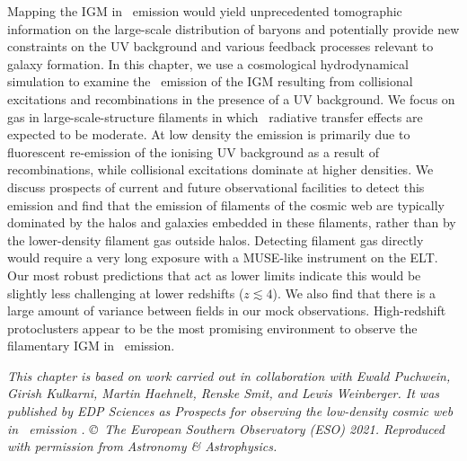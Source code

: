    \fancyhf{}
    \fancyfoot[C]{\color{white}\thepage}
    \newpage
    \setFancyHdr
\fi


\vspace*{\fill}

\noindent Mapping the IGM in \lya\ emission would yield unprecedented tomographic information on the large-scale distribution of baryons and potentially provide new constraints on the UV background and various feedback processes relevant to galaxy formation. In this chapter, we use a cosmological hydrodynamical simulation to examine the \lya\ emission of the IGM resulting from collisional excitations and recombinations in the presence of a UV background. We focus on gas in large-scale-structure filaments in which \lya\ radiative transfer effects are expected to be moderate. At low density the emission is primarily due to fluorescent re-emission of the ionising UV background as a result of recombinations, while collisional excitations dominate at higher densities. We discuss prospects of current and future observational facilities to detect this emission and find that the emission of filaments of the cosmic web are typically dominated by the halos and galaxies embedded in these filaments, rather than by the lower-density filament gas outside halos. Detecting filament gas directly would require a very long exposure with a MUSE-like instrument on the ELT. Our most robust predictions that act as lower limits indicate this would be slightly less challenging at lower redshifts ($z \lesssim 4$). We also find that there is a large amount of variance between fields in our mock observations. High-redshift protoclusters appear to be the most promising environment to observe the filamentary IGM in \lymana\ emission.

\vspace{3ex}
\begin{mdframed}[backgroundcolor=black!2.5]
    \textsl{This chapter is based on work carried out in collaboration with Ewald Puchwein, Girish Kulkarni, Martin Haehnelt, Renske Smit, and Lewis Weinberger. It was published by EDP Sciences as \textup{Prospects for observing the low-density cosmic web in \lymana\ emission} \citep[, Astronomy \& Astrophysics, 650, A98]{2021A&A...650A..98W}. \copyright\ The European Southern Observatory (ESO) 2021. Reproduced with permission from Astronomy \& Astrophysics.}
\end{mdframed}
\vspace*{\fill}

